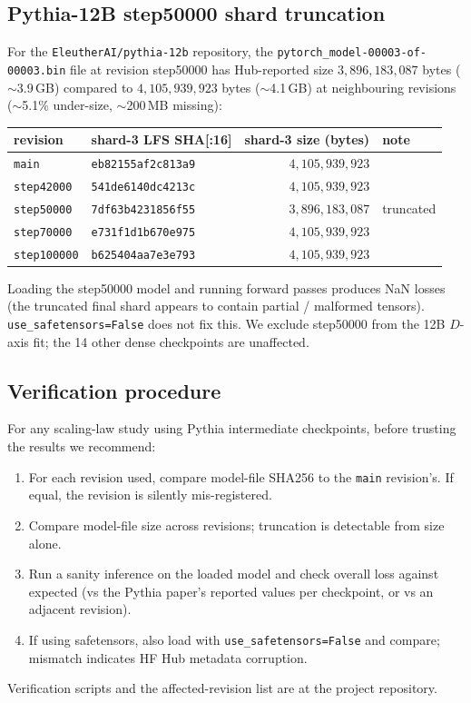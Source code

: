 \documentclass[10pt]{article}
\begin{document}
\subsection{Pythia-12B step50000 shard truncation}

For the \verb|EleutherAI/pythia-12b| repository, the
\verb|pytorch_model-00003-of-00003.bin| file at revision step50000
has Hub-reported size $3{,}896{,}183{,}087$ bytes ($\sim$3.9\,GB)
compared to $4{,}105{,}939{,}923$ bytes ($\sim$4.1\,GB) at neighbouring
revisions ($\sim$5.1\% under-size, $\sim$200\,MB missing):

\begin{center}
\small
\begin{tabular}{llrl}
\toprule
revision   & shard-3 LFS SHA[:16]   & shard-3 size (bytes) & note \\
\midrule
\texttt{main}        & \texttt{eb82155af2c813a9} & $4{,}105{,}939{,}923$ & \\
\texttt{step42000}   & \texttt{541de6140dc4213c} & $4{,}105{,}939{,}923$ & \\
\texttt{step50000}   & \texttt{7df63b4231856f55} & $3{,}896{,}183{,}087$ & truncated \\
\texttt{step70000}   & \texttt{e731f1d1b670e975} & $4{,}105{,}939{,}923$ & \\
\texttt{step100000}  & \texttt{b625404aa7e3e793} & $4{,}105{,}939{,}923$ & \\
\bottomrule
\end{tabular}
\end{center}

Loading the step50000 model and running forward passes produces NaN
losses (the truncated final shard appears to contain partial /
malformed tensors). \verb|use_safetensors=False| does not fix this.
We exclude step50000 from the 12B $D$-axis fit; the 14 other dense
checkpoints are unaffected.

\subsection{Verification procedure}

For any scaling-law study using Pythia intermediate checkpoints,
before trusting the results we recommend:
\begin{enumerate}
  \item For each revision used, compare model-file SHA256 to the
        \verb|main| revision's. If equal, the revision is silently
        mis-registered.
  \item Compare model-file size across revisions; truncation is
        detectable from size alone.
  \item Run a sanity inference on the loaded model and check overall
        loss against expected (vs the Pythia paper's reported values
        per checkpoint, or vs an adjacent revision).
  \item If using safetensors, also load with
        \verb|use_safetensors=False| and compare; mismatch indicates
        HF Hub metadata corruption.
\end{enumerate}
Verification scripts and the affected-revision list are at the
project repository.
\end{document}
